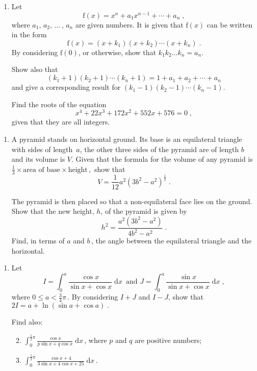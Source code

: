 \documentclass[a4, 11pt]{report}
\newlength{\qspace}
\newcounter{qnumber}
\newenvironment{question}%
 {\vspace{\qspace}
  \begin{enumerate}[\bfseries 1\quad][10]%
    \setcounter{enumi}{\value{qnumber}}%
    \item%
 }
{
  \end{enumerate}
  \filbreak
  \stepcounter{qnumber}
 }
\newenvironment{questionparts}[1][1]%
 {
  \begin{enumerate}[\bfseries (i)]%
    \setcounter{enumii}{#1}
    \addtocounter{enumii}{-1}
    \setlength{\itemsep}{5mm}
    \setlength{\parskip}{8pt}
 }
 {
  \end{enumerate}
 }
\def\d{{\mathrm d}}
\def\f{{\mathrm f}}
\def\le{\leqslant}
\begin{document}
\begin{question}
Let 
\[
\f(x) = x^n + a_1 x^{n-1} + \cdots + a_n\;,
\]
where $a_1$, $a_2$, $\ldots$\,, $a_n$ are given numbers.
It is given that $\f(x)$ can be written in the form
\[
\f(x) = (x+k_1)(x+k_2)\cdots(x+k_n)\;.
\]
By considering
$\f(0)$, or otherwise, show that $k_1k_2 \ldots k_n =a_n$.

Show also that $$(k_1+1)(k_2+1)\cdots(k_n+1)= 1+a_1+a_2+\cdots+a_n$$ and give a 
corresponding result for $(k_1-1)(k_2-1)\cdots(k_n-1)$.


Find the roots of the equation
\[
x^4 +22x^3 +172x^2 +552x+576=0\;,
\]
given that they are all integers.
	\end{question}
	
\begin{question}
A   pyramid stands on horizontal ground. Its base is an equilateral triangle with sides of length~$a$,  the other three 
 sides of the pyramid are of length $b$ and its volume is $V$. Given that the 
formula for the volume of any pyramid is   
$
 \textstyle
\frac13 \times \mbox{area of base} \times \mbox {height} \,,
$
show that 
\[
V= \frac1{12} {a^2(3b^2-a^2)}^{\frac12}\;.
\]

The pyramid is then placed  so that a non-equilateral face  lies on the ground.
Show that the new height, $h$, of the pyramid is given by 
\[
h^2 = \frac{a^2(3b^2-a^2)}{4b^2-a^2}\;.
\]
Find, in terms of $a$ and $b\,$, the angle between the 
equilateral triangle and the horizontal.
\end{question}
	
\begin{question}
Let
\[
I= \int_0^a \frac {\cos x}{\sin x + \cos x} \; \d x \,
\mbox{ \ \ \ \ and  \ \ \ \ }
J= \int_0^a \frac {\sin  x}{\sin x + \cos x} \; \d x \;,
\]
where $0\le a <\frac{3}{4}\pi\,$.
By considering $I+J$ and $I-J$,  show that 
$
2I= a + \ln (\sin a +\cos a)\;.
$

Find also:
\begin{questionparts}
\item 
$\displaystyle \int_0^{\frac{1}{2}\pi} \frac {\cos x}{p\sin x + q\cos x} \; \d x \,$, where $p$ and $q$ 
are positive numbers;
\item 
$\displaystyle \int_0^{\frac{1}{2}\pi} \frac {\cos x+4}{3\sin x + 4\cos x+ 25} \; \d x \,$.
\end{questionparts}
\end{question}
		
\end{document}
